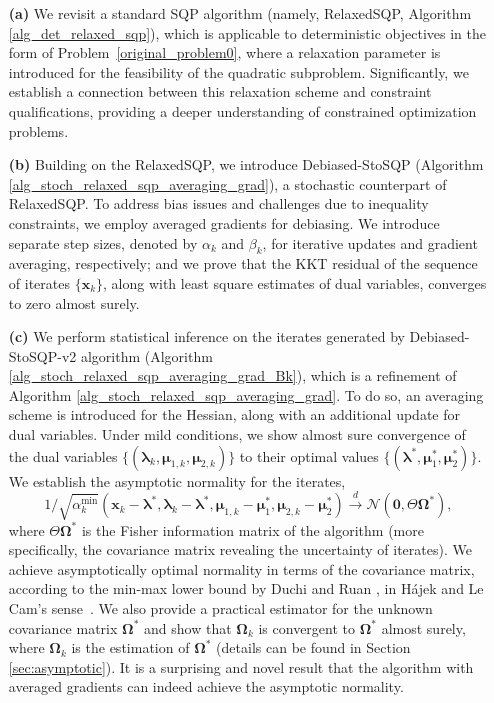 \documentclass[aos]{imsart}
\numberwithin{equation}{section}
\theoremstyle{plain}
\begin{document}
\begin{enumerate}
    \item[\textbf{(a)}] We revisit a standard SQP algorithm (namely, RelaxedSQP, Algorithm \ref{alg_det_relaxed_sqp}), which is applicable to deterministic objectives in the form of Problem~\eqref{original_problem0}, where a relaxation parameter is introduced for the feasibility of the quadratic subproblem. Significantly, we establish a connection between this relaxation scheme and constraint qualifications, providing a deeper understanding of constrained optimization problems.
    

    \item[\textbf{(b)}] Building on the RelaxedSQP, we introduce Debiased-StoSQP (Algorithm \ref{alg_stoch_relaxed_sqp_averaging_grad}), a stochastic counterpart of RelaxedSQP.
    To address bias issues and challenges due to inequality constraints, we employ averaged gradients for debiasing. 
    We introduce separate step sizes, denoted by  $\alpha_k$ and $\beta_k$, for iterative updates and gradient averaging, respectively; and we prove that the KKT residual of the sequence of iterates  $\{\bm{x}_k\}$, along with least square estimates of dual variables, converges to zero almost surely. 

    \item[\textbf{(c)}] 
    We perform statistical inference on the iterates generated by Debiased-StoSQP-v2 algorithm (Algorithm \ref{alg_stoch_relaxed_sqp_averaging_grad_Bk}), which is a refinement of Algorithm \ref{alg_stoch_relaxed_sqp_averaging_grad}. 
    To do so, an averaging scheme is introduced for the Hessian, along with an additional update for dual variables. 
    Under mild conditions, we show almost sure convergence of the dual variables $\{(\bm{\lambda}_{k}, \bm{\mu}_{1,k}, \bm{\mu}_{2,k})\}$ to their optimal values $\{(\bm{\lambda}^{*}, \bm{\mu}_{1}^{*}, \bm{\mu}_{2}^{*})\}$.  
    We establish the asymptotic normality for the iterates, 
    $$ 1/\sqrt{\alpha_k^{\text{min}}}(\bm{x}_k - \bm{\lambda}^{*}, \bm{\lambda}_{k} - \bm{\lambda}^{*}, \bm{\mu}_{1,k} - \bm{\mu}_1^{*}, \bm{\mu}_{2,k} - \bm{\mu}_2^{*}) \stackrel{d}{\longrightarrow} \mathcal{N} \left( \bm{0}, \Theta \bm{\Omega}^{*} \right) ,$$ 
    where $\Theta \bm{\Omega}^{*}$ is the Fisher information matrix of the algorithm (more specifically, the covariance matrix revealing the uncertainty of iterates). 
    We achieve asymptotically optimal normality in terms of the covariance matrix, according to the min-max lower bound by Duchi and Ruan \cite{duchi2021asymptotic}, in H\'ajek and Le Cam's sense~\cite{le2000asymptotics, van2000asymptotic}. 
    We also provide a practical estimator for the unknown covariance matrix $ \bm{\Omega}^{*}$ and show that $\bm{\Omega}_k$ is convergent to $\bm{\Omega}^{*}$ almost surely,
    where $\bm{\Omega}_k$ is the estimation of $\bm{\Omega}^{*}$ (details can be found in Section \ref{sec:asymptotic}). 
    It is a surprising and novel result that the algorithm with averaged gradients can indeed achieve the asymptotic normality.
\end{enumerate}
\end{document}
